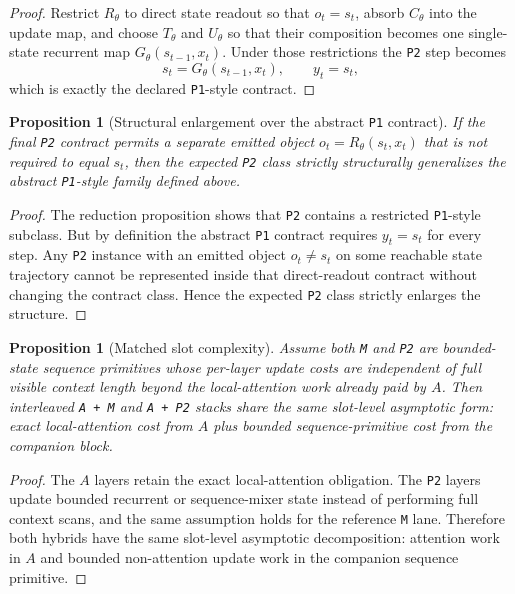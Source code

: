 \documentclass[11pt]{article}
\newtheorem{proposition}[definition]{Proposition}
\begin{document}
\begin{proof}
Restrict $R_\theta$ to direct state readout so that $o_t = s_t$, absorb
$C_\theta$ into the update map, and choose $T_\theta$ and $U_\theta$ so that
their composition becomes one single-state recurrent map
$G_\theta(s_{t-1}, x_t)$. Under those restrictions the \texttt{P2} step
becomes
\[
  s_t = G_\theta(s_{t-1}, x_t), \qquad y_t = s_t,
\]
which is exactly the declared \texttt{P1}-style contract.
\end{proof}

\begin{proposition}[Structural enlargement over the abstract \texttt{P1} contract]
If the final \texttt{P2} contract permits a separate emitted object
$o_t = R_\theta(s_t, x_t)$ that is not required to equal $s_t$, then the
expected \texttt{P2} class strictly structurally generalizes the abstract
\texttt{P1}-style family defined above.
\end{proposition}

\begin{proof}
The reduction proposition shows that \texttt{P2} contains a restricted
\texttt{P1}-style subclass. But by definition the abstract \texttt{P1}
contract requires $y_t = s_t$ for every step. Any \texttt{P2} instance with
an emitted object $o_t \neq s_t$ on some reachable state trajectory cannot be
represented inside that direct-readout contract without changing the contract
class. Hence the expected \texttt{P2} class strictly enlarges the structure.
\end{proof}

\begin{proposition}[Matched slot complexity]
Assume both \texttt{M} and \texttt{P2} are bounded-state sequence primitives
whose per-layer update costs are independent of full visible context length
beyond the local-attention work already paid by $A$. Then interleaved
\texttt{A + M} and \texttt{A + P2} stacks share the same slot-level asymptotic
form: exact local-attention cost from $A$ plus bounded sequence-primitive cost
from the companion block.
\end{proposition}

\begin{proof}
The $A$ layers retain the exact local-attention obligation. The \texttt{P2}
layers update bounded recurrent or sequence-mixer state instead of performing
full context scans, and the same assumption holds for the reference
\texttt{M} lane. Therefore both hybrids have the same slot-level asymptotic
decomposition: attention work in $A$ and bounded non-attention update work in
the companion sequence primitive.
\end{proof}
\end{document}
